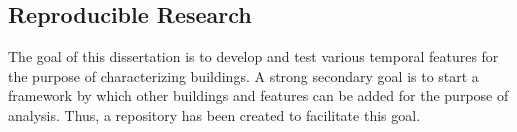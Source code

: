\subsection{Reproducible Research}
\label{sec:reproducibleresearch}

The goal of this dissertation is to develop and test various temporal features for the purpose of characterizing buildings. A strong secondary goal is to start a framework by which other buildings and features can be added for the purpose of analysis. Thus, a repository has been created to facilitate this goal.